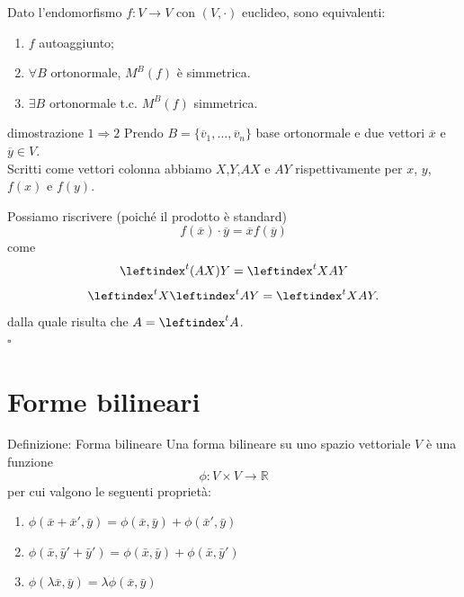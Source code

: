 \documentclass[x11names]{article}
\newcommand*{\QEDB}{\null\nobreak\hfill\ensuremath{\square}}%
\begin{document}
Dato l'endomorfismo $f: V \longrightarrow V$ con  $\left(V,\cdot\right)$ euclideo, sono equivalenti:

\begin{enumerate}
	\item $f$ autoaggiunto;
	\item $\forall B$ ortonormale, $M^B\left(f\right)$ è simmetrica.
	\item $\exists B$ ortonormale t.c. $M^B\left(f\right)$ simmetrica.
\end{enumerate}

\begin{es}{dimostrazione $1\Rightarrow 2$}
	Prendo $B = \{\overline{v}_{1},\dots,\overline{v}_{n}\}$ base ortonormale e due vettori $\overline{x}$ e $\overline{y} \in V$.\\
	
	Scritti come vettori colonna abbiamo $X$,$Y$,$AX$ e  $AY$ rispettivamente per  $x$,  $y$,  $f\left(x\right)$ e $f\left(y\right)$. 
	
	Possiamo riscrivere (poiché il prodotto è standard)
	\[
	f\left(\overline{x}\right)\cdot \overline{y} = \overline{x}f\left(\overline{y}\right)
	\] 
	come 
	\[
	\leftindex^t{\left(AX\right)}Y = \leftindex^t{X}AY
	\] 
	\[
	\leftindex^t{X}\leftindex^t{A}Y = \leftindex^t{X}AY
	.\] 
	dalla quale risulta che $A = \leftindex^t{A}$.
	\\
	\QEDB
\end{es}


\newpage
\section{Forme bilineari}
	\begin{center}
	\colorbox{myblue}{\begin{minipage}{5.75in}
			\begin{blues}{Definizione: Forma bilineare}
			Una forma bilineare su uno spazio vettoriale $V$ è una funzione
			\[
			\phi: V\times V \to \mathbb{R}
			\]
			per cui valgono le seguenti proprietà:
			\begin{enumerate}
				\item $\phi (\bar{x} + \bar{x}',\bar{y}) = \phi (\bar{x},\bar{y}) + \phi (\bar{x}',\bar{y})$
				\item $\phi (\bar{x}, \bar{y}' + \bar{y}') = \phi (\bar{x},\bar{y}) + \phi (\bar{x},\bar{y}')$
				\item  $\phi(\lambda\bar{x},\bar{y}) = \lambda \phi(\bar{x},\bar{y})$
			\end{enumerate}
			\end{blues}
	\end{minipage}}       
\end{center}
\end{document}
